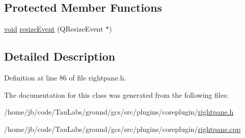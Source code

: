 \subsection*{\-Protected \-Member \-Functions}
\begin{DoxyCompactItemize}
\item 
\hyperlink{group___u_a_v_objects_plugin_ga444cf2ff3f0ecbe028adce838d373f5c}{void} \hyperlink{group___core_plugin_ga5e424134c6bc790d1496f8bad768a6ef}{resize\-Event} (\-Q\-Resize\-Event $\ast$)
\end{DoxyCompactItemize}


\subsection{\-Detailed \-Description}


\-Definition at line 86 of file rightpane.\-h.



\-The documentation for this class was generated from the following files\-:\begin{DoxyCompactItemize}
\item 
/home/jb/code/\-Tau\-Labs/ground/gcs/src/plugins/coreplugin/\hyperlink{rightpane_8h}{rightpane.\-h}\item 
/home/jb/code/\-Tau\-Labs/ground/gcs/src/plugins/coreplugin/\hyperlink{rightpane_8cpp}{rightpane.\-cpp}\end{DoxyCompactItemize}
